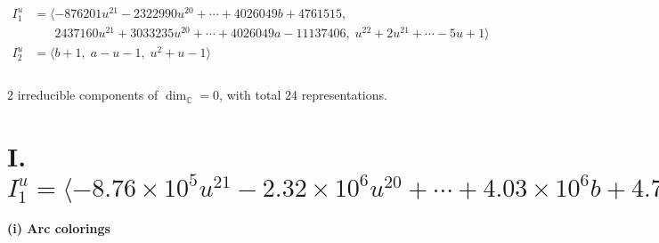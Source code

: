 \documentclass[1p]{elsarticle_modified}
\theoremstyle{definition}
\begin{document}
\begin{align*}
I^u_{1}&=\langle 
-876201 u^{21}-2322990 u^{20}+\cdots+4026049 b+4761515,\\
\phantom{I^u_{1}}&\phantom{= \langle  }2437160 u^{21}+3033235 u^{20}+\cdots+4026049 a-11137406,\;u^{22}+2 u^{21}+\cdots-5 u+1\rangle \\
I^u_{2}&=\langle 
b+1,\;a- u-1,\;u^2+u-1\rangle \\
\\
\end{align*}
\raggedright * 2 irreducible components of $\dim_{\mathbb{C}}=0$, with total 24 representations.\\
\newpage
\renewcommand{\arraystretch}{1}
\centering \section*{I. $I^u_{1}= \langle -8.76\times10^{5} u^{21}-2.32\times10^{6} u^{20}+\cdots+4.03\times10^{6} b+4.76\times10^{6},\;2.44\times10^{6} u^{21}+3.03\times10^{6} u^{20}+\cdots+4.03\times10^{6} a-1.11\times10^{7},\;u^{22}+2 u^{21}+\cdots-5 u+1 \rangle$}
\flushleft \textbf{(i) Arc colorings}\\
\end{document}
